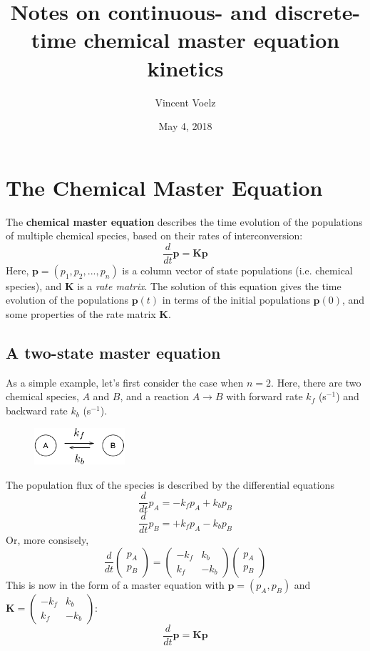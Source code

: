 \documentclass[11pt, oneside]{article}   	%
\title{Notes on continuous- and discrete-time chemical master equation kinetics}
\author{Vincent Voelz}
\date{May 4, 2018}							%
\begin{document}
\maketitle


\section*{The Chemical Master Equation}


The \textbf{chemical master equation} describes the time evolution of the populations of multiple chemical species, based on their rates of interconversion:
\[
\frac{d}{dt} \mathbf{p} = \mathbf{K} \mathbf{p}
\]
Here, $\mathbf{p} = (p_1, p_2, ..., p_n)$ is a column vector of state populations (i.e. chemical species), and $\mathbf{K}$ is a \textit{rate matrix}.  The solution of this equation gives the time evolution of the populations $\mathbf{p}(t)$  in terms of the initial populations $\mathbf{p}(0)$, and some properties of the rate matrix $\mathbf{K}$.

\subsection*{A two-state master equation}

As a simple example, let's first consider the case when $n=2$. Here, there are two chemical species, $A$ and $B$, and a reaction $A \rightarrow B$ with forward rate $k_f$ (s$^{-1}$) and backward rate $k_b$ (s$^{-1}$).

\begin{figure}[htbp]
\begin{center}
\includegraphics[width=0.3\textwidth]{two-state}
\end{center}	
\end{figure}

The population flux of the species is described by the differential equations
\[
\frac{d}{dt} p_A = -k_f p_A + k_b p_B 
\]
\[
\frac{d}{dt} p_B = +k_f p_A - k_b p_B
\]
Or, more consisely,
\[
\frac{d}{dt} \begin{pmatrix}
	p_A \\
	p_B \end{pmatrix} = \begin{pmatrix}
	-k_f & k_b \\
	k_f  & -k_b \end{pmatrix} \begin{pmatrix}
	p_A \\
	p_B \end{pmatrix} 
\]
This is now in the form of a master equation with $\mathbf{p} = (p_A, p_B)$ and $\mathbf{K} = \begin{pmatrix}
	-k_f & k_b \\
	k_f  & -k_b \end{pmatrix} $:
\[
\frac{d}{dt} \mathbf{p} = \mathbf{K} \mathbf{p}
\]
\end{document}
